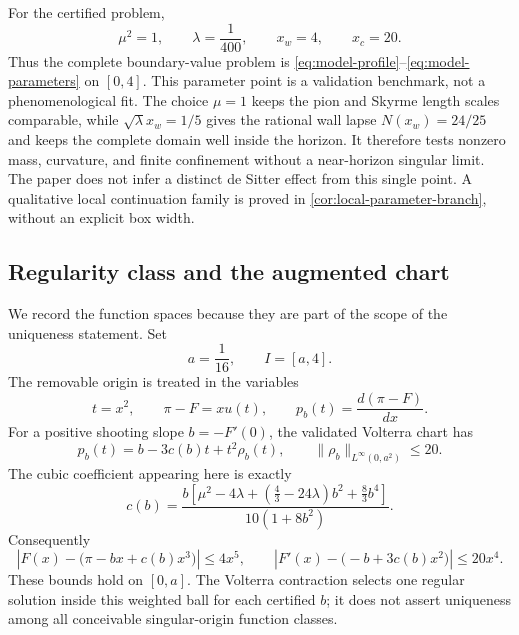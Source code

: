For the certified problem,
\begin{equation}
  \mu^2=1,
  \qquad
  \lambda=\frac1{400},
  \qquad
  x_w=4,
  \qquad
  x_c=20.
  \label{eq:model-parameters}
\end{equation}
Thus the complete boundary-value problem is
\eqref{eq:model-profile}--\eqref{eq:model-parameters} on \([0,4]\).
This parameter point is a validation benchmark, not a phenomenological fit.
The choice \(\mu=1\) keeps the pion and Skyrme length scales comparable, while
\(\sqrt\lambda x_w=1/5\) gives the rational wall lapse
\(N(x_w)=24/25\) and keeps the complete domain well inside the horizon.  It
therefore tests nonzero mass, curvature, and finite confinement without a
near-horizon singular limit.  The paper does not infer a distinct de Sitter
effect from this single point.  A qualitative local continuation family is
proved in \cref{cor:local-parameter-branch}, without an explicit box width.

\subsection*{Regularity class and the augmented chart}

We record the function spaces because they are part of the scope of the
uniqueness statement.  Set
\[
  a=\frac1{16},
  \qquad
  I=[a,4].
\]
The removable origin is treated in the variables
\[
  t=x^2,
  \qquad
  \pi-F=xu(t),
  \qquad
  p_b(t)=\frac{d(\pi-F)}{dx}.
\]
For a positive shooting slope \(b=-F'(0)\), the validated Volterra chart has
\begin{equation}
  p_b(t)=b-3c(b)t+t^2\rho_b(t),
  \qquad
  \|\rho_b\|_{L^\infty(0,a^2)}\le 20.
  \label{eq:model-origin-ball}
\end{equation}
The cubic coefficient appearing here is exactly
\begin{equation}
  c(b)=\frac{b\left[
       \mu^2-4\lambda+\left(\frac43-24\lambda\right)b^2
       +\frac83b^4\right]}
       {10(1+8b^2)}.
  \label{eq:model-cubic}
\end{equation}
Consequently
\begin{equation}
  \left|F(x)-\bigl(\pi-bx+c(b)x^3\bigr)\right|
     \le 4x^5,
  \qquad
  \left|F'(x)-\bigl(-b+3c(b)x^2\bigr)\right|
     \le 20x^4.
  \label{eq:model-origin-bounds}
\end{equation}
These bounds hold on \([0,a]\).  The Volterra contraction selects one regular
solution inside
this weighted ball for each certified \(b\); it does not assert uniqueness
among all conceivable singular-origin function classes.

